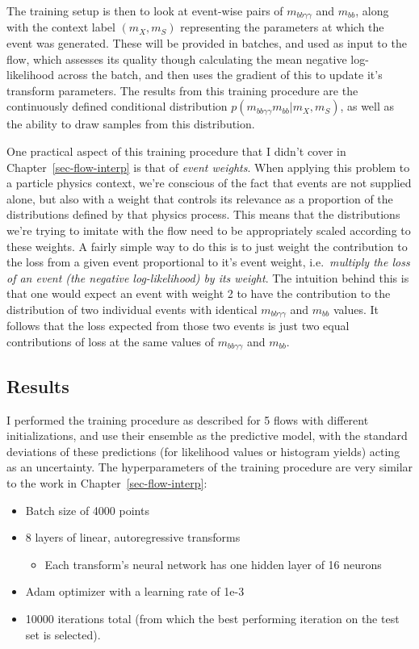 \documentclass[
  11pt,
  numbers=noendperiod]{book}
\providecommand{\tightlist}{%
  \setlength{\itemsep}{0pt}\setlength{\parskip}{0pt}}\usepackage{longtable,booktabs,array}
\begin{document}
The training setup is then to look at event-wise pairs of
\(m_{bb\gamma\gamma}\) and \(m_{bb}\), along with the context label
\((m_X, m_S)\) representing the parameters at which the event was
generated. These will be provided in batches, and used as input to the
flow, which assesses its quality though calculating the mean negative
log-likelihood across the batch, and then uses the gradient of this to
update it's transform parameters. The results from this training
procedure are the continuously defined conditional distribution
\(p(m_{bb\gamma\gamma} m_{bb} | m_X, m_S)\), as well as the ability to
draw samples from this distribution.

One practical aspect of this training procedure that I didn't cover in
Chapter~\ref{sec-flow-interp} is that of \emph{event weights}. When
applying this problem to a particle physics context, we're conscious of
the fact that events are not supplied alone, but also with a weight that
controls its relevance as a proportion of the distributions defined by
that physics process. This means that the distributions we're trying to
imitate with the flow need to be appropriately scaled according to these
weights. A fairly simple way to do this is to just weight the
contribution to the loss from a given event proportional to it's event
weight, i.e.~\emph{multiply the loss of an event (the negative
log-likelihood) by its weight}. The intuition behind this is that one
would expect an event with weight 2 to have the contribution to the
distribution of two individual events with identical
\(m_{bb\gamma\gamma}\) and \(m_{bb}\) values. It follows that the loss
expected from those two events is just two equal contributions of loss
at the same values of \(m_{bb\gamma\gamma}\) and \(m_{bb}\).

\hypertarget{results}{%
\subsection{Results}\label{results}}

I performed the training procedure as described for 5 flows with
different initializations, and use their ensemble as the predictive
model, with the standard deviations of these predictions (for likelihood
values or histogram yields) acting as an uncertainty. The
hyperparameters of the training procedure are very similar to the work
in Chapter~\ref{sec-flow-interp}:

\begin{itemize}
\tightlist
\item
  Batch size of 4000 points
\item
  8 layers of linear, autoregressive transforms

  \begin{itemize}
  \tightlist
  \item
    Each transform's neural network has one hidden layer of 16 neurons
  \end{itemize}
\item
  Adam optimizer with a learning rate of 1e-3
\item
  10000 iterations total (from which the best performing iteration on
  the test set is selected).
\end{itemize}
\end{document}
